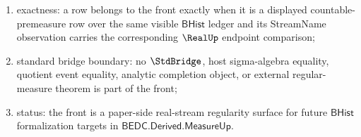 \begin{definition}
\begin{enumerate}
  \autoref{thm:measure-streamname-endpoint-carrier-classifier},
  \autoref{thm:measure-root-countable-premeasure-additivity-obligation},
  \autoref{thm:measure-streamname-countable-additivity-scope},
  \autoref{thm:measure-obligation-countable-sum-classifier-stability},
  \autoref{thm:measure-root-countable-premeasure-consumer-threshold}, and
  \autoref{thm:measure-streamname-downstream-consumer-boundary};
  \item exactness: a row belongs to the front exactly when it is a displayed
  countable-premeasure row over the same visible $\mathsf{BHist}$ ledger and
  its StreamName observation carries the corresponding $\RealUp$ endpoint
  comparison;
  \item standard bridge boundary: no $\StdBridge$, host sigma-algebra equality,
  quotient event equality, analytic completion object, or external
  regular-measure theorem is part of the front;
  \item status: the front is a paper-side real-stream regularity surface for
  future $\mathsf{BHist}$ formalization targets in
  $\mathsf{BEDC.Derived.MeasureUp}$.
\end{enumerate}
\end{definition}

